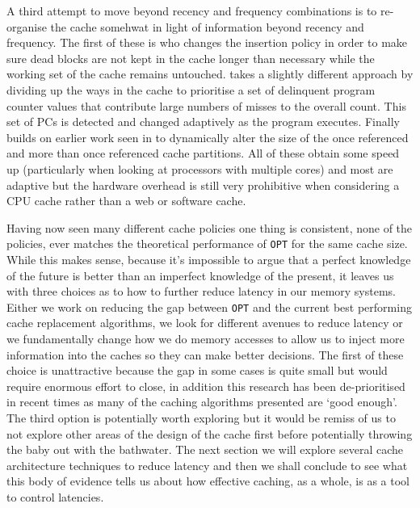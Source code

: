 A third attempt to move beyond recency and frequency combinations is to re-organise the cache somehwat in light of information beyond recency and frequency. The first of these is \citet{chaudhuriPseudoLIFOFoundationNew2009a} who changes the insertion policy in order to make sure dead blocks are not kept in the cache longer than necessary while the working set of the cache remains untouched. \citet{manikantanNUcacheEfficientMulticore2011} takes a slightly different approach by dividing up the ways in the cache to prioritise a set of delinquent program counter values that contribute large numbers of misses to the overall count. This set of PCs is detected and changed adaptively as the program executes. Finally \citet{khanDecoupledDynamicCache2012} builds on earlier work seen in \citet{johnson2QLowOverhead1994} to dynamically alter the size of the once referenced and more than once referenced cache partitions. All of these obtain some speed up (particularly when looking at processors with multiple cores) and most are adaptive but the hardware overhead is still very prohibitive when considering a CPU cache rather than a web or software cache.

Having now seen many different cache policies one thing is consistent, none of the policies, ever matches the theoretical performance of \texttt{OPT} for the same cache size. While this makes sense, because it's impossible to argue that a perfect knowledge of the future is better than an imperfect knowledge of the present, it leaves us with three choices as to how to further reduce latency in our memory systems. Either we work on reducing the gap between \texttt{OPT} and the current best performing cache replacement algorithms, we look for different avenues to reduce latency or we fundamentally change how we do memory accesses to allow us to inject more information into the caches so they can make better decisions. The first of these choice is unattractive because the gap in some cases is quite small but would require enormous effort to close, in addition this research has been de-prioritised in recent times \cite{podlipnigSurveyWebCache2003} as many of the caching algorithms presented are `good enough'. The third option is potentially worth exploring but it would be remiss of us to not explore other areas of the design of the cache first before potentially throwing the baby out with the bathwater. The next section we will explore several cache architecture techniques to reduce latency and then we shall conclude to see what this body of evidence tells us about how effective caching, as a whole, is as a tool to control latencies.

